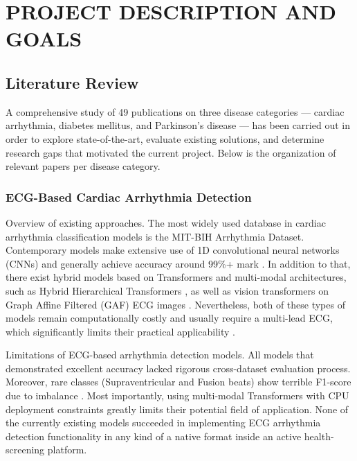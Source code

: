 \chapter{\MakeUppercase{Project Description and Goals}}
\justifying

\section{Literature Review}

A comprehensive study of 49 publications on three disease categories — cardiac arrhythmia, diabetes mellitus, and Parkinson's disease — has been carried out in order to explore state-of-the-art, evaluate existing solutions, and determine research gaps that motivated the current project. Below is the organization of relevant papers per disease category.

\subsection{ECG-Based Cardiac Arrhythmia Detection}

Overview of existing approaches.
The most widely used database in cardiac arrhythmia classification models is the MIT-BIH Arrhythmia Dataset. Contemporary models make extensive use of 1D convolutional neural networks (CNNs) and generally achieve accuracy around 99\%+ mark \cite{guhdar2024, kavitha2024, kerdoudi2024, venkatesh2026}. In addition to that, there exist hybrid models based on Transformers and multi-modal architectures, such as Hybrid Hierarchical Transformers \cite{dutenhefner2026}, as well as vision transformers on Graph Affine Filtered (GAF) ECG images \cite{khatar2024}. Nevertheless, both of these types of models remain computationally costly and usually require a multi-lead ECG, which significantly limits their practical applicability \cite{liu2024, mahajan2024}.

Limitations of ECG-based arrhythmia detection models.
All models that demonstrated excellent accuracy lacked rigorous cross-dataset evaluation process. Moreover, rare classes (Supraventricular and Fusion beats) show terrible F1-score due to imbalance \cite{ayyub2025}. Most importantly, using multi-modal Transformers with CPU deployment constraints greatly limits their potential field of application. None of the currently existing models succeeded in implementing ECG arrhythmia detection functionality in any kind of a native format inside an active health-screening platform.


